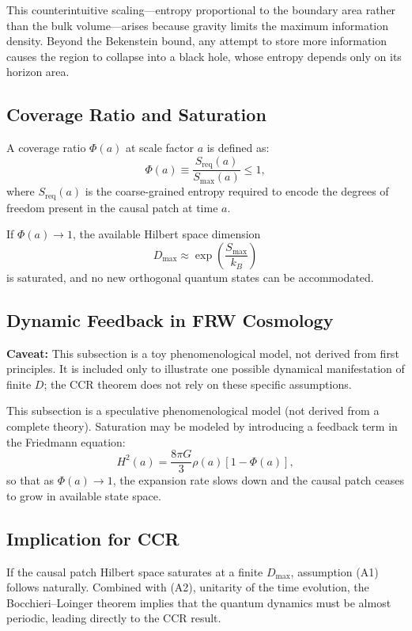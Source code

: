 \documentclass[12pt]{article}
\newcommand{\Smax}{S_{\max}}
\theoremstyle{remark}
\begin{document}
This counterintuitive scaling---entropy proportional to the boundary area rather than the bulk volume---arises because gravity 
limits the maximum information density. Beyond the Bekenstein bound, any attempt to store more information causes the region 
to collapse into a black hole, whose entropy depends only on its horizon area.


\subsection{Coverage Ratio and Saturation}
A coverage ratio \(\Phi(a)\) at scale factor \(a\) is defined as:
\begin{equation}
\Phi(a) \equiv \frac{S_{\text{req}}(a)}{\Smax(a)} \le 1,
\end{equation}
where \(S_{\text{req}}(a)\) is the coarse-grained entropy required to encode the degrees of freedom present in the causal patch at time \(a\).

If \(\Phi(a) \to 1\), the available Hilbert space dimension
\begin{equation}
D_{\max} \approx \exp\left( \frac{\Smax}{k_B} \right)
\end{equation}
is saturated, and no new orthogonal quantum states can be accommodated.

\subsection{Dynamic Feedback in FRW Cosmology}
\textbf{Caveat:} This subsection is a toy phenomenological model, not derived from first principles. 
It is included only to illustrate one possible dynamical manifestation of finite $D$; 
the CCR theorem does not rely on these specific assumptions.

This subsection is a speculative phenomenological model (not derived from a complete theory). Saturation may be modeled by introducing a feedback term in the Friedmann equation:
\begin{equation}
H^2(a) = \frac{8\pi G}{3} \rho(a) \left[1 - \Phi(a)\right],
\end{equation}
so that as \(\Phi(a) \to 1\), the expansion rate slows down and the causal patch ceases to grow in available state space.

\subsection{Implication for CCR}
If the causal patch Hilbert space saturates at a finite \(D_{\max}\), assumption (A1) follows naturally. Combined with (A2), unitarity of the time evolution, the Bocchieri--Loinger theorem implies that the quantum dynamics must be almost periodic, leading directly to the CCR result.
\end{document}
